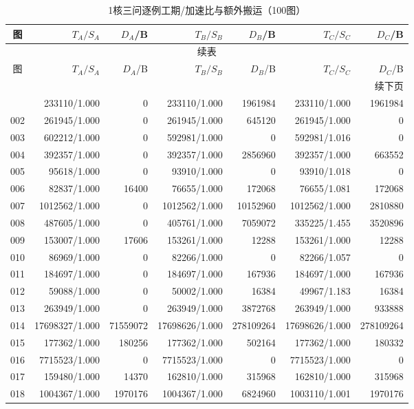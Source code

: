 \begin{longtable}{crrrrrr}
\caption{1核三问逐例工期/加速比与额外搬运（100图）}\label{tab:detail-1}\\
\toprule
图 & $T_A/S_A$ & $D_A$/B & $T_B/S_B$ & $D_B$/B & $T_C/S_C$ & $D_C$/B \\
\midrule
\endfirsthead
\multicolumn{7}{c}{续表}\\
\toprule
图 & $T_A/S_A$ & $D_A$/B & $T_B/S_B$ & $D_B$/B & $T_C/S_C$ & $D_C$/B \\
\midrule
\endhead
\midrule\multicolumn{7}{r}{续下页}\\
\endfoot
\bottomrule
\endlastfoot
001 & 233110/1.000 & 0 & 233110/1.000 & 1961984 & 233110/1.000 & 1961984 \\
002 & 261945/1.000 & 0 & 261945/1.000 & 645120 & 261945/1.000 & 0 \\
003 & 602212/1.000 & 0 & 592981/1.000 & 0 & 592981/1.016 & 0 \\
004 & 392357/1.000 & 0 & 392357/1.000 & 2856960 & 392357/1.000 & 663552 \\
005 & 95618/1.000 & 0 & 93910/1.000 & 0 & 93910/1.018 & 0 \\
006 & 82837/1.000 & 16400 & 76655/1.000 & 172068 & 76655/1.081 & 172068 \\
007 & 1012562/1.000 & 0 & 1012562/1.000 & 10152960 & 1012562/1.000 & 2810880 \\
008 & 487605/1.000 & 0 & 405761/1.000 & 7059072 & 335225/1.455 & 3520896 \\
009 & 153007/1.000 & 17606 & 153261/1.000 & 12288 & 153261/1.000 & 12288 \\
010 & 86969/1.000 & 0 & 82266/1.000 & 0 & 82266/1.057 & 0 \\
011 & 184697/1.000 & 0 & 184697/1.000 & 167936 & 184697/1.000 & 167936 \\
012 & 59088/1.000 & 0 & 50002/1.000 & 16384 & 49967/1.183 & 16384 \\
013 & 263949/1.000 & 0 & 263949/1.000 & 3872768 & 263949/1.000 & 933888 \\
014 & 17698327/1.000 & 71559072 & 17698626/1.000 & 278109264 & 17698626/1.000 & 278109264 \\
015 & 177362/1.000 & 180256 & 177362/1.000 & 502164 & 177362/1.000 & 180332 \\
016 & 7715523/1.000 & 0 & 7715523/1.000 & 0 & 7715523/1.000 & 0 \\
017 & 159480/1.000 & 14370 & 162810/1.000 & 315968 & 162810/1.000 & 315968 \\
018 & 1004367/1.000 & 1970176 & 1004367/1.000 & 6824960 & 1003110/1.001 & 1970176 \\

\end{longtable}
